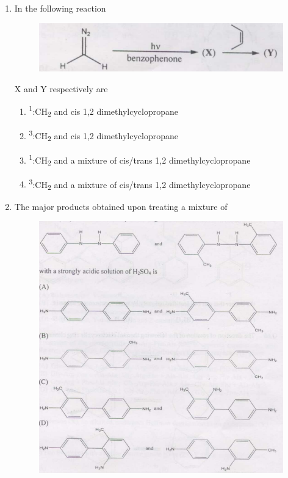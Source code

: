 \documentclass[journal,12pt,onecolumn]{IEEEtran}
\theoremstyle{remark}
\begin{document}
\begin{enumerate}
Mainly occurs at \hfill{  }

\begin{multicols}{2}
\begin{enumerate}
     \item   position 1
     \item   position 2
     \item   position 3
     \item   either position 4 or 5
\end{enumerate}
\end{multicols}

  

\item  In the following reaction \hfill{}

\begin{figure}
    \centering
    \includegraphics[width=0.5\columnwidth]{figs/image6.png}
    \caption{}
    \label{fig:figure6}
\end{figure}


X and Y respectively are

\begin{multicols}{2}
\begin{enumerate}
     \item   \textsuperscript{1}:CH\textsubscript{2} and cis 1,2 dimethylcyclopropane
     \item   \textsuperscript{3}:CH\textsubscript{2} and cis 1,2 dimethylcyclopropane
     \item   \textsuperscript{1}:CH\textsubscript{2} and a mixture of cis/trans 1,2 dimethylcyclopropane
     \item   \textsuperscript{3}:CH\textsubscript{2} and a mixture of cis/trans 1,2 dimethylcyclopropane
\end{enumerate}
\end{multicols}

\item  The major products obtained upon treating a mixture of \hfill{}
\begin{figure}
    \centering
    \includegraphics[width=0.5\columnwidth]{figs/image7.png} 
    \caption{}
    \label{fig:figure7}
\end{figure}


\end{enumerate}
\end{document}
